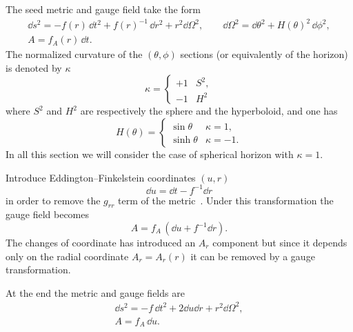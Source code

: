 The seed metric and gauge field take the form
\begin{subequations}
\label{algo:eq:static:tr}
\begin{gather}
	\label{algo:eq:static:metric:tr}
	\dd s^2 = - f(r)\, \dd t^2 + f(r)^{-1}\, \dd r^2 + r^2 \dd \Omega^2, \qquad
	\dd \Omega^2 = \dd\theta^2 + H(\theta)^2\, \dd \phi^2, \\
	\label{algo:eq:static:vector:tr}
	A = f_A(r)\, \dd t.
\end{gather}
\end{subequations}
The normalized curvature of the $(\theta, \phi)$ sections (or equivalently of the horizon) is denoted by $\kappa$
\begin{equation}
	\kappa =
	\begin{cases}
		+1 & S^2, \\
		-1 & H^2
	\end{cases}
\end{equation} 
where $S^2$ and $H^2$ are respectively the sphere and the hyperboloid,\footnotemark{} and one has%
\begin{equation}
	H(\theta) =
	\begin{cases}
		\sin \theta & \kappa = 1, \\
		\sinh \theta & \kappa = -1.
	\end{cases}
\end{equation} 
In all this section we will consider the case of spherical horizon with $\kappa = 1$.


Introduce Eddington--Finkelstein coordinates $(u, r)$
\begin{equation}
	\dd u = \dd t - f^{-1} \dd r
\end{equation} 
in order to remove the $g_{rr}$ term of the metric~\cite{Newman:1965:NoteKerrSpinningParticle}.
Under this transformation the gauge field becomes
\begin{equation}
	A = f_A\, (\dd u + f^{-1} \dd r).
\end{equation} 
The changes of coordinate has introduced an $A_r$ component but since it depends only on the radial coordinate $A_r = A_r(r)$ it can be removed by a gauge transformation.

At the end the metric and gauge fields are
\begin{subequations}
\label{algo:eq:static:ur}
\begin{gather}
	\label{algo:eq:static:metric:ur}
	\dd s^2 = - f\, \dd t^2 + 2 \dd u \dd r + r^2 \dd \Omega^2, \\
	\label{algo:eq:static:vector:ur}
	A = f_A\, \dd u.
\end{gather} 
\end{subequations}

